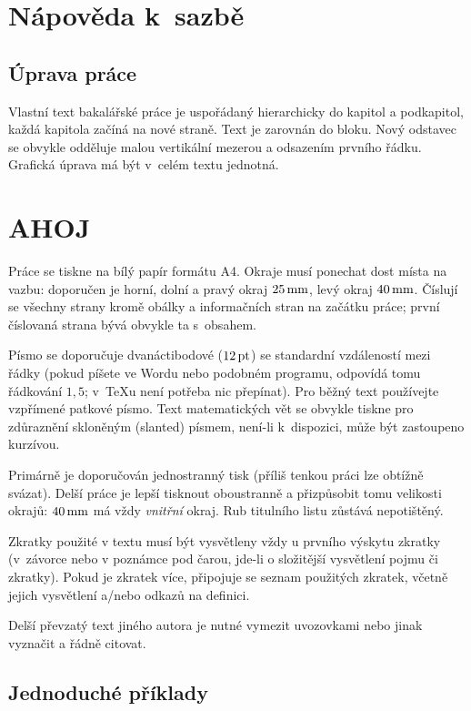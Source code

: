 
\chapter{Nápověda k~sazbě}

\section{Úprava práce}

Vlastní text bakalářské práce je uspořádaný hierarchicky do kapitol a podkapitol,
každá kapitola začíná na nové straně. Text je zarovnán do bloku. Nový odstavec
se obvykle odděluje malou vertikální mezerou a odsazením prvního řádku. Grafická
úprava má být v~celém textu jednotná.

\chapter{AHOJ}

Práce se tiskne na bílý papír formátu A4. Okraje musí ponechat dost místa na vazbu:
doporučen je horní, dolní a pravý okraj $25\,\rm mm$, levý okraj $40\,\rm mm$.
Číslují se všechny strany kromě obálky a informačních stran na začátku práce;
první číslovaná strana bývá obvykle ta s~obsahem.

Písmo se doporučuje dvanáctibodové ($12\,\rm pt$) se standardní vzdáleností mezi řádky
(pokud píšete ve Wordu nebo podobném programu, odpovídá tomu řádkování $1,5$; v~\TeX{}u
není potřeba nic přepínat). Pro běžný text používejte vzpřímené patkové písmo.
Text matematických vět se obvykle tiskne pro zdůraznění skloněným (slanted) písmem,
není-li k~dispozici, může být zastoupeno kurzívou.

Primárně je doporučován jednostranný tisk (příliš tenkou práci lze obtížně svázat).
Delší práce je lepší tisknout oboustranně a přizpůsobit tomu velikosti okrajů:
$40\,\rm mm$ má vždy \emph{vnitřní} okraj. Rub titulního listu zůstává nepotištěný.

Zkratky použité v textu musí být vysvětleny vždy u prvního výskytu zkratky (v~závorce nebo
v poznámce pod čarou, jde-li o složitější vysvětlení pojmu či zkratky). Pokud je zkratek
více, připojuje se seznam použitých zkratek, včetně jejich vysvětlení a/nebo odkazů
na definici.

Delší převzatý text jiného autora je nutné vymezit uvozovkami nebo jinak vyznačit a řádně
citovat.

\section{Jednoduché příklady}


